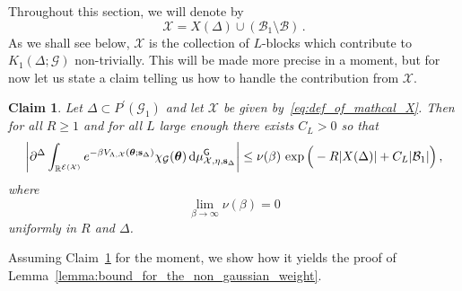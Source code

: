 \documentclass[11pt]{article}
\newtheorem{claim}[theorem]{Claim}
\theoremstyle{definition}
\theoremstyle{remark}
\numberwithin{theorem}{section}
\newcommand{\bR}{\mathbb R}
\newcommand{\cE}{\mathcal{E}}
\begin{document}
    Throughout this section, we will denote by 
    \begin{equation}
    \label{eq:def_of_mathcal_X}
        \mathcal{X} = X(\Delta)\cup (\mathcal{B}_1 \setminus \mathcal{B}) \, . 
    \end{equation}
    As we shall see below, $\mathcal{X}$ is the collection of $L$-blocks which contribute to $K_1(\Delta;\mathcal{G})$ non-trivially. This will be made more precise in a moment, but for now let us state a claim telling us how to handle the contribution from $\mathcal{X}$. 
    \begin{claim}\label{claim:estimate_of_derivative_non_gaussian_correction_X}
        Let $\Delta\subset P^\prime(\mathcal{G}_1)$ and let $\mathcal{X}$ be given by~\eqref{eq:def_of_mathcal_X}. Then for all $R \ge 1$ and for all $L$ large enough there exists $C_L>0$ so that  
        \[
        \bigg| \partial^\Delta \int_{\bR^{\cE(\mathcal{X})}} e^{-\beta V_{\Lambda,\mathcal{X}}(\boldsymbol{\theta};\mathbf{s}_\Delta)} \chi_{\mathcal{G}}(\boldsymbol{\theta}) \, {\rm d}\mu_{\mathcal{X},\eta,\mathbf{s}_\Delta}^{\sf G} \bigg| \le \nu(\beta) \, \exp\Big(-R|X(\Delta)| + C_L |\mathcal{B}_1|\Big)  \, , 
        \]
        where
        \[
        \lim_{\beta \to \infty} \nu(\beta) = 0
        \]
        uniformly in $R$ and $\Delta$. 
    \end{claim}
    Assuming Claim~\ref{claim:estimate_of_derivative_non_gaussian_correction_X} for the moment, we show how it yields the proof of Lemma~\ref{lemma:bound_for_the_non_gaussian_weight}.
    
\end{document}

